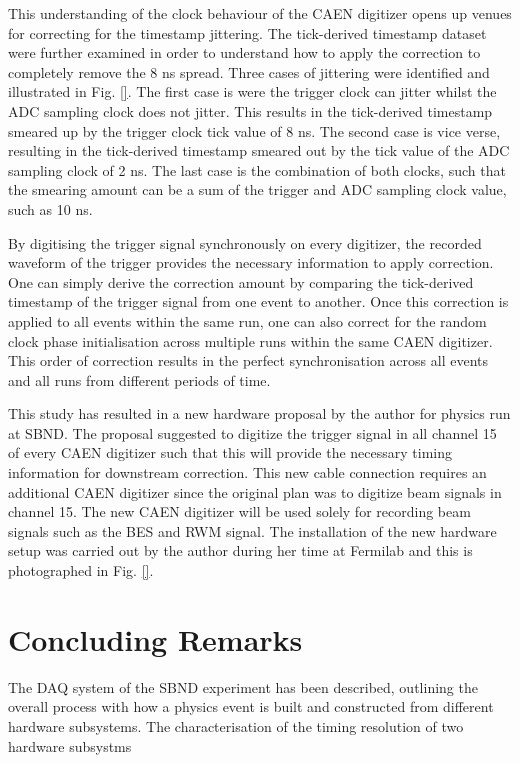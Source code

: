 This understanding of the clock behaviour of the CAEN digitizer opens up venues for correcting for the timestamp jittering.
The tick-derived timestamp dataset were further examined in order to understand how to apply the correction to completely remove the 8 ns spread.
Three cases of jittering were identified and illustrated in Fig. \ref{}.
The first case is were the trigger clock can jitter whilst the ADC sampling clock does not jitter.
This results in the tick-derived timestamp smeared up by the trigger clock tick value of 8 ns.
The second case is vice verse, resulting in the tick-derived timestamp smeared out by the tick value of the ADC sampling clock of 2 ns.
The last case is the combination of both clocks, such that the smearing amount can be a sum of the trigger and ADC sampling clock value, such as 10 ns.

By digitising the trigger signal synchronously on every digitizer, the recorded waveform of the trigger provides the necessary information to apply correction.
One can simply derive the correction amount by comparing the tick-derived timestamp of the trigger signal from one event to another.
Once this correction is applied to all events within the same run, one can also correct for the random clock phase initialisation across multiple runs within the same CAEN digitizer.
This order of correction results in the perfect synchronisation across all events and all runs from different periods of time.

This study has resulted in a new hardware proposal by the author for physics run at SBND.
The proposal suggested to digitize the trigger signal in all channel 15 of every CAEN digitizer such that this will provide the necessary timing information for downstream correction.
This new cable connection requires an additional CAEN digitizer since the original plan was to digitize beam signals in channel 15.
The new CAEN digitizer will be used solely for recording beam signals such as the BES and RWM signal.
The installation of the new hardware setup was carried out by the author during her time at Fermilab and this is photographed in Fig. \ref {}.

\section{Concluding Remarks}
\label{section5.5}

The DAQ system of the SBND experiment has been described, outlining the overall process with how a physics event is built and constructed from different hardware subsystems.
The characterisation of the timing resolution of two hardware subsystms
